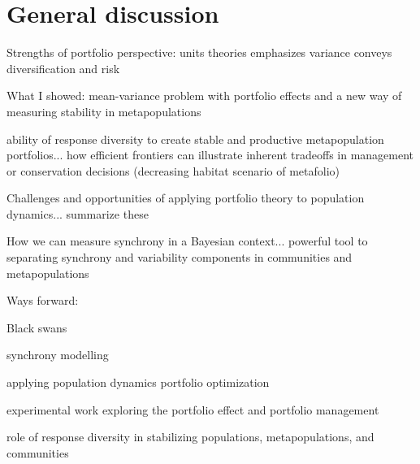 \chapter{General discussion}

Strengths of portfolio perspective:
units theories
emphasizes variance
conveys diversification and risk

What I showed:
mean-variance problem with portfolio effects and a new way of measuring stability in metapopulations

ability of response diversity to create stable and productive metapopulation portfolios... how efficient frontiers can illustrate inherent tradeoffs in management or conservation decisions (decreasing habitat scenario of metafolio)

Challenges and opportunities of applying portfolio theory to population dynamics... summarize these

How we can measure synchrony in a Bayesian context... powerful tool to separating synchrony and variability components in communities and metapopulations

Ways forward:

Black swans

synchrony modelling

applying population dynamics portfolio optimization

experimental work exploring the portfolio effect and portfolio management

role of response diversity in stabilizing populations, metapopulations, and communities
